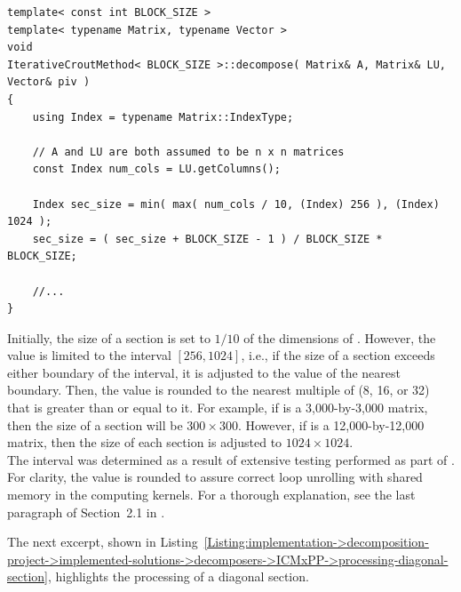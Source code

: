 \begin{lstlisting}[caption={An excerpt from the definition of the overloaded \code{decompose()} method for the ICM\_\textit{x}PP decomposer. This definition matches the declaration shown in Listing~\ref{Listing:implementation->decomposition-project->implemented-solutions->decomposers->ICMxPP->method-declaration-initial-estimate}. The \code{Index} type and dimension-representing variables are included for clarity. The template parameter \code{BLOCK\_SIZE}, equivalent to \textit{x} in ICM\_\textit{x}PP, represents the number of threads in the 1st and 2nd dimensions of a CUDA thread block.},label={Listing:implementation->decomposition-project->implemented-solutions->decomposers->ICMxPP->size-of-sections}]
template< const int BLOCK_SIZE >
template< typename Matrix, typename Vector >
void
IterativeCroutMethod< BLOCK_SIZE >::decompose( Matrix& A, Matrix& LU, Vector& piv )
{
	using Index = typename Matrix::IndexType;
	
	// A and LU are both assumed to be n x n matrices
	const Index num_cols = LU.getColumns();
	
	Index sec_size = min( max( num_cols / 10, (Index) 256 ), (Index) 1024 );
	sec_size = ( sec_size + BLOCK_SIZE - 1 ) / BLOCK_SIZE * BLOCK_SIZE;
	
	//...
}
\end{lstlisting}

Initially, the size of a section is set to $1/10$ of the dimensions of . However, the value is limited to the interval $\left[256, 1024\right]$, i.e., if the size of a section exceeds either boundary of the interval, it is adjusted to the value of the nearest boundary. Then, the value is rounded to the nearest multiple of  (8, 16, or 32) that is greater than or equal to it. For example, if  is a 3,000-by-3,000 matrix, then the size of a section will be $300\times300$. However, if  is a 12,000-by-12,000 matrix, then the size of each section is adjusted to $1024\times1024$.\\
The interval was determined as a result of extensive testing performed as part of  \cite{Cejka2022}. For clarity, the value is rounded to assure correct loop unrolling with shared memory in the computing kernels. For a thorough explanation, see the last paragraph of Section~2.1 in  \cite{Cejka2022}.

The next excerpt, shown in Listing~\ref{Listing:implementation->decomposition-project->implemented-solutions->decomposers->ICMxPP->processing-diagonal-section}, highlights the processing of a diagonal section.

